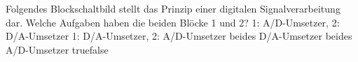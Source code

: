     {Folgendes Blockschaltbild stellt das Prinzip einer digitalen Signalverarbeitung dar. Welche Aufgaben haben die beiden Blöcke 1 und 2?}
    {1: A/D-Umsetzer, 2: D/A-Umsetzer}
    {1: D/A-Umsetzer, 2: A/D-Umsetzer}
    {beides D/A-Umsetzer}
    {beides A/D-Umsetzer}
    {true}{false}